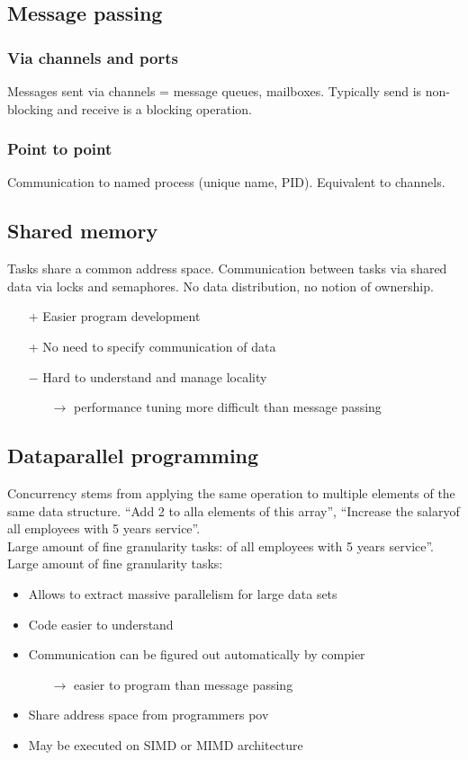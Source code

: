 \documentclass[a4paper]{article}
\begin{document}
\subsection{Message passing}
\subsubsection{Via channels and ports}
Messages sent via channels = message queues, mailboxes. Typically send is
non-blocking and receive is a blocking operation.
\subsubsection{Point to point}
Communication to named process (unique name, PID). Equivalent to channels.
\subsection{Shared memory}
Tasks share a common address space. Communication between tasks via shared data
via locks and semaphores. No data distribution, no notion of ownership.
\begin{itemize}
    \item[+] Easier program development
    \item[+] No need to specify communication of data
    \item[$-$] Hard to understand and manage locality
        \begin{itemize}
            \item[$\rightarrow$] performance tuning more difficult than message
                passing
        \end{itemize}
\end{itemize}
\subsection{Dataparallel programming}
Concurrency stems from applying the same operation to multiple elements of the same
data structure. ``Add 2 to alla elements of this array'', ``Increase the salaryof all employees with 5 years service''. 
\\Large amount of fine granularity tasks:
of all employees with 5 years service''. Large amount of fine granularity tasks:
\begin{itemize}
    \item Allows to extract massive parallelism for large data sets
    \item Code easier to understand
    \item Communication can be figured out automatically by compier
        \begin{itemize}
            \item[$\rightarrow$] easier to program than message passing
        \end{itemize}
    \item Share address space from programmers pov
    \item May be executed on SIMD or MIMD architecture
\end{itemize}
\end{document}
